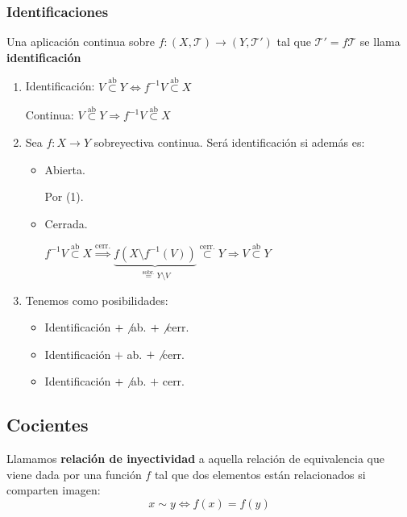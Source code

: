 \subsubsection*{Identificaciones}
\begin{defi}
Una aplicación continua sobre $f: \left( X, \mathcal{T} \right) \rightarrow \left( Y, \mathcal{T}' \right)$ tal que $\mathcal{T}' = f\mathcal{T}$ se llama \textbf{identificación} 
\end{defi}

\begin{obs}
\begin{enumerate}
    \item Identificación: $V \stackrel{\text{ab}}{\subset} Y \Leftrightarrow f^{-1}V \stackrel{\text{ab}}{\subset} X$

    Continua: $V \stackrel{\text{ab}}{\subset } Y \Rightarrow f^{-1}V \stackrel{\text{ab}}{\subset} X$

    \item Sea $f: X \rightarrow Y$ sobreyectiva continua. Será identificación si además es:
    \begin{itemize}
        \item Abierta. 
        \begin{demo}
            Por (1).
        \end{demo}
        \item Cerrada.
        \begin{demo}
            $f^{-1}V \stackrel{\text{ab}}{\subset} X \stackrel{\text{cerr.}}{\Rightarrow} \underbrace{f \left( X \setminus f^{-1}\left( V \right) \right)}_{\stackrel{\text{sobr.}}{=} Y\setminus V}  \stackrel{\text{cerr.}}{\subset} Y \Rightarrow V \stackrel{\text{ab}}{\subset} Y$
        \end{demo}
    \end{itemize}

    \item Tenemos como posibilidades:
    \begin{itemize}
        \item Identificación $+ \not$ ab. $+ \not$ cerr.
        \item Identificación $+$ ab. $+ \not$ cerr.
        \item Identificación $+ \not$ ab. $+$ cerr.
    \end{itemize}
\end{enumerate}
\end{obs}

\subsection{Cocientes}
\label{sub:cocientes}
\begin{defi}
Llamamos \textbf{relación de inyectividad} a aquella relación de equivalencia que viene dada por una función $f$ tal que dos elementos están relacionados si comparten imagen:
\[
x \sim y \Leftrightarrow f\left( x \right) = f\left( y \right)
\]
\end{defi}

